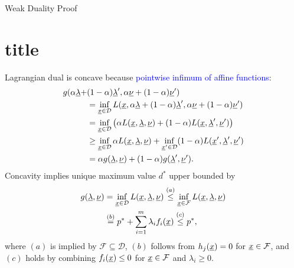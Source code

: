 \documentclass[10pt,english,hide notes,aspectratio=169]{beamer}
\begin{document}
\begin{frame}{Weak Duality Proof}
\part{title}
Lagrangian dual is concave because \textcolor{blue}{pointwise infimum of affine functions}:\vspace{-1mm}
\begin{align*}
g(\alpha\vecnot{\lambda}+&(1-\alpha)\vecnot{\lambda}',\alpha\vecnot{\nu}+(1-\alpha)\vecnot{\nu}') \\
&= \inf_{\vecnot{x}\in \mathcal{D}} L(\vecnot{x},\alpha\vecnot{\lambda}+(1-\alpha)\vecnot{\lambda}',\alpha\vecnot{\nu}+(1-\alpha) \vecnot{\nu}') \\
&= \inf_{\vecnot{x}\in \mathcal{D}} \big( \alpha L(\vecnot{x},\vecnot{\lambda},\vecnot{\nu}) + (1-\alpha) L(\vecnot{x},\vecnot{\lambda}',\vecnot{\nu}') \big) \\
&\geq \inf_{\vecnot{x}\in \mathcal{D}} \alpha L(\vecnot{x},\vecnot{\lambda},\vecnot{\nu}) + \inf_{\vecnot{x}'\in \mathcal{D}} (1-\alpha) L(\vecnot{x}',\vecnot{\lambda}',\vecnot{\nu}') \\
&= \alpha g(\vecnot{\lambda},\vecnot{\nu}) + (1-\alpha) g(\vecnot{\lambda}',\vecnot{\nu}'). \vspace{-1mm}
\end{align*}
Concavity implies unique maximum value $d^*$ upper bounded by \vspace{-2mm}
\begin{align*}
g(\vecnot{\lambda},\vecnot{\nu})
&= \inf_{\vecnot{x}\in \mathcal{D}} L(\vecnot{x},\vecnot{\lambda},\vecnot{\nu})
\stackrel{(a)}{\leq} \inf_{\vecnot{x}\in \mathcal{F}} L(\vecnot{x},\vecnot{\lambda},\vecnot{\nu}) \\
&\stackrel{(b)}{=} p^* + \sum_{i=1}^m \lambda_i f_i (\vecnot{x})
\stackrel{(c)}{\leq} p^*, \vspace{-3mm}
\end{align*}
where $(a)$ is implied by $\mathcal{F} \subseteq \mathcal{D}$, $(b)$ follows from $h_j(\underline{x}) = 0$ for $\underline{x}\in \mathcal{F}$, and $(c)$ holds by combining $f_i(\underline{x}) \leq 0$ for $\underline{x}\in \mathcal{F}$ and $\lambda_i \geq 0$.

\end{frame}
\end{document}
